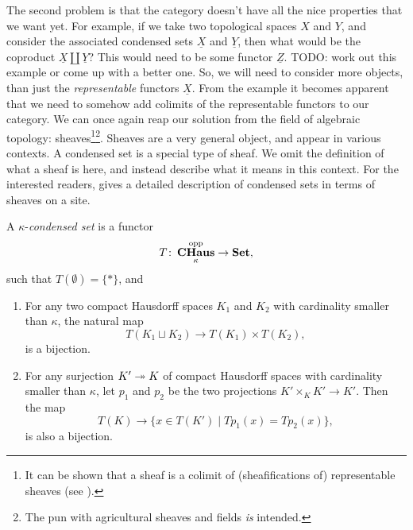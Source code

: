 \documentclass{article}
\DeclareMathOperator{\opp}{opp}
\DeclareMathOperator{\CHaus}{\mathbf{CHaus}}
\begin{document}
The second problem is that the category doesn't have all
the nice properties that we want yet. For example,
if we take two topological spaces $X$ and $Y$, and
consider the associated condensed sets $\underline{X}$
and $\underline{Y}$, then what would be the coproduct
$\underline{X} \coprod \underline{Y}$? This would need
to be some functor $\underline{Z}$. TODO: work out this
example or come up with a better one.
So, we will need to consider more objects, than just
the \emph{representable} functors $\underline{X}$.
From the example it becomes apparent that we need
to somehow add colimits of the representable functors
to our category. We can once again reap our solution from
the field of algebraic topology: sheaves\footnote{
    It can be shown that a sheaf is a colimit of (sheafifications of) representable
    sheaves (see
    \cite[\href{https://stacks.math.columbia.edu/tag/0GLW}{Lemma 0GLW}]{stacks-project}).
}\footnote{
    The pun with agricultural sheaves and fields \emph{is} intended.
}. Sheaves are a very general object, and appear in various
contexts. A condensed set is a special type of sheaf.
We omit the definition of what a sheaf is here, and instead
describe what it means in this context. For the interested
readers, \cite[Section 1.2]{Dag2021FoundationsCM} gives
a detailed description of condensed sets in terms of sheaves
on a site.
\begin{definition}
    A $\kappa$-\emph{condensed set} is a functor
    \begin{equation*}
        T \colon \CHaus_{\kappa}^{\opp} \to \Set,
    \end{equation*}
    such that $T(\emptyset) = \{*\}$, and
    \begin{enumerate}
        \item For any two compact Hausdorff spaces $K_1$ and $K_2$ with cardinality
              smaller than $\kappa$, the natural map
              \begin{equation*}
                  T(K_1 \sqcup K_2) \to T(K_1) \times T(K_2),
              \end{equation*}
              is a bijection.
        \item For any surjection $K' \twoheadrightarrow K$ of compact Hausdorff spaces
              with cardinality smaller than $\kappa$, let $p_1$ and $p_2$
              be the two projections $K'\times_K K' \to K'$. Then the map
              \begin{equation*}
                  T(K) \to \{x \in T(K') \mid Tp_1(x) = Tp_2(x)\},
              \end{equation*}
              is also a bijection.
    \end{enumerate}
\end{definition}
\end{document}
